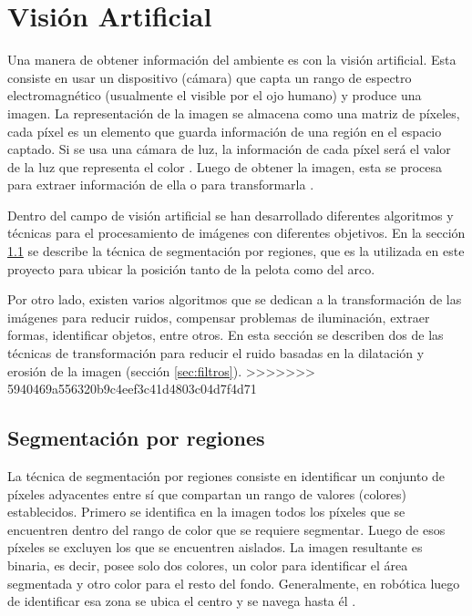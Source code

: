 \section{Visión Artificial} \label{sect:Vision_Artificial}

Una manera de obtener información del ambiente es con la visión artificial. Esta consiste en usar un dispositivo (cámara) que capta un rango de espectro electromagnético (usualmente el visible por el ojo humano) y produce una imagen. La representación de la imagen se almacena como una matriz de píxeles, cada píxel es un elemento que guarda información de una región en el espacio captado. Si se usa una cámara de luz, la información de cada píxel será el valor de la luz que representa el color . Luego de obtener la imagen, esta se procesa para extraer información de ella o para transformarla \cite{AiRobotics}.

Dentro del campo de visión artificial se han desarrollado diferentes algoritmos y t\'ecnicas para el procesamiento de imágenes con diferentes objetivos. En la sección \ref{sec:Segmentacion} se describe la t\'ecnica de segmentaci\'on por regiones, que es la utilizada en este proyecto para ubicar la posición tanto de la pelota como del arco. 

Por otro lado, existen varios algoritmos que se dedican a la transformación de las imágenes para reducir ruidos, compensar problemas de iluminación, extraer formas, identificar objetos, entre otros. En esta sección se describen dos de las técnicas de transformación para reducir el ruido basadas en la dilatación y erosión de la imagen (secci\'on \ref{sec:filtros}). 
>>>>>>> 5940469a556320b9c4eef3c41d4803c04d7f4d71
 
\subsection{Segmentaci\'on por regiones}\label{sec:Segmentacion}

La técnica de segmentación por regiones consiste en identificar un conjunto de píxeles adyacentes entre sí que compartan un rango de valores (colores) establecidos. Primero se identifica en la imagen todos los píxeles que se encuentren dentro del rango de color que se requiere segmentar. Luego de esos píxeles se excluyen los que se encuentren aislados. La imagen resultante es binaria, es decir, posee solo dos colores, un color para identificar el área segmentada y otro color para el resto del fondo.
Generalmente, en robótica luego de identificar esa zona se ubica el centro y se navega hasta él \cite{AiRobotics}. 

